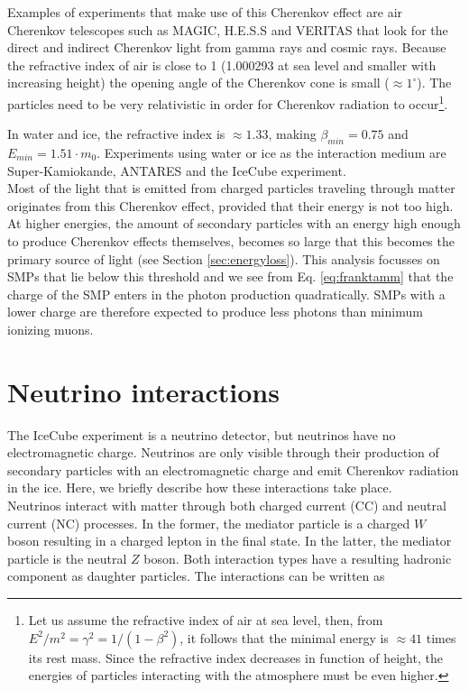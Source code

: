 \noindent Examples of experiments that make use of this Cherenkov effect are air Cherenkov telescopes such as MAGIC, H.E.S.S and VERITAS that look for the direct and indirect Cherenkov light from gamma rays and cosmic rays. Because the refractive index of air is close to 1 (1.000293 at sea level and smaller with increasing height) the opening angle of the Cherenkov cone is small ($\approx 1^{\circ}$). The particles need to be very relativistic in order for Cherenkov radiation to occur\footnote{Let us assume the refractive index of air at sea level, then, from $E^2/m^2 = \gamma^2 = 1/(1-\beta^2)$, it follows that the minimal energy is $\approx 41$ times its rest mass. Since the refractive index decreases in function of height, the energies of particles interacting with the atmosphere must be even higher.}.

In water and ice, the refractive index is $\approx 1.33$, making $\beta_{min} = 0.75$ and $E_{min} = 1.51 \cdot m_0$. Experiments using water or ice as the interaction medium are Super-Kamiokande, ANTARES and the IceCube experiment.\\

\noindent Most of the light that is emitted from charged particles traveling through matter originates from this Cherenkov effect, provided that their energy is not too high. At higher energies, the amount of secondary particles with an energy high enough to produce Cherenkov effects themselves, becomes so large that this becomes the primary source of light (see Section \ref{sec:energyloss}). This analysis focusses on SMPs that lie below this threshold and we see from Eq. \ref{eq:franktamm} that the charge of the SMP enters in the photon production quadratically. SMPs with a lower charge are therefore expected to produce less photons than minimum ionizing muons.

\section{Neutrino interactions}
\label{sec:neutrinointeractions}
The IceCube experiment is a neutrino detector, but neutrinos have no electromagnetic charge. Neutrinos are only visible through their production of secondary particles with an electromagnetic charge and emit Cherenkov radiation in the ice. Here, we briefly describe how these interactions take place.\\

\noindent Neutrinos interact with matter through both charged current (CC) and neutral current (NC) processes. In the former, the mediator particle is a charged $W$ boson resulting in a charged lepton in the final state. In the latter, the mediator particle is the neutral $Z$ boson. Both interaction types have a resulting hadronic component as daughter particles. The interactions can be written as

